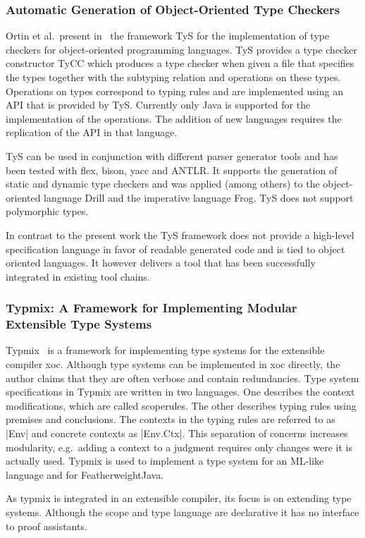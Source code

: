 \subsubsection{Automatic Generation of Object-Oriented Type Checkers}
Ortin et al.\ present in~\cite{ortin2014automatic} the framework TyS
for the implementation of type checkers for object-oriented
programming languages. TyS provides a type checker constructor TyCC
which produces a type checker when given a file that specifies the
types together with the subtyping relation and operations on these
types. Operations on types correspond to typing rules and are
implemented using an API that is provided by TyS. Currently only Java
is supported for the implementation of the operations. The addition of
new languages requires the replication of the API in that language.

TyS can be used in conjunction with different parser generator tools
and has been tested with flex, bison, yacc and ANTLR. It supports
the generation of static and dynamic type checkers and was applied
(among others) to the object-oriented language Drill and the
imperative language Frog. TyS does not support polymorphic types.

In contrast to the present work the TyS framework does not provide a
high-level specification language in favor of readable generated code
and is tied to object oriented languages. It however delivers a tool
that has been successfully integrated in existing tool chains.
\subsubsection{Typmix: A Framework for Implementing Modular Extensible Type
  Systems}
Typmix~\cite{bergan2007typmix} is a framework for implementing type
systems for the extensible compiler xoc. Although type systems can be
implemented in xoc directly, the author claims that they are often
verbose and contain redundancies. Type system specifications in Typmix
are written in two languages. One describes the context modifications,
which are called scoperules. The other describes typing rules using
premises and conclusions. The contexts in the typing rules are
referred to as \code|Env| and concrete contexts as
\code|Env.Ctx|. This separation of concerns increases modularity,
e.g.\ adding a context to a judgment requires only changes were it is
actually used. Typmix is used to implement a type system for an
ML-like language and for FeatherweightJava.

As typmix is integrated in an extensible compiler, its focus is on
extending type systems. Although the scope and type language are
declarative it has no interface to proof assistants.

